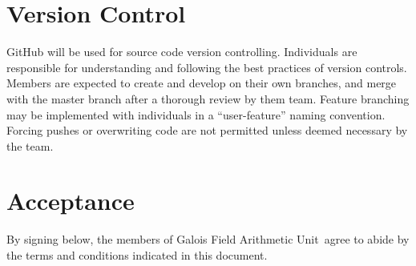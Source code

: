 \documentclass[paper=usletter, fontsize=12pt]{article}
\newcommand{\team}{Galois Field Arithmetic Unit}
\begin{document}
    \section{Version Control}

        GitHub will be used for source code version controlling. Individuals are responsible for understanding and following the best practices of version controls. Members are expected to create and develop on their own branches, and merge with the master branch after a thorough review by them team. Feature branching may be implemented with individuals in a “user-feature” naming convention. Forcing pushes or overwriting code are not permitted unless deemed necessary by the team.

    \section{Acceptance}

    By signing below, the members of \team \ agree to abide by the terms and conditions indicated in this document. \\
\end{document}
